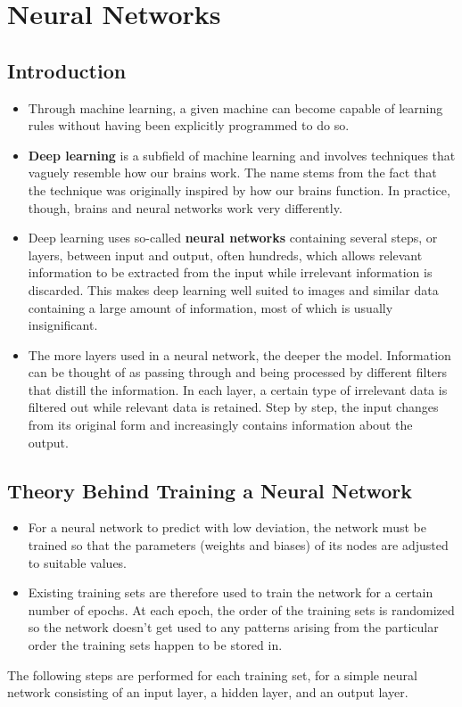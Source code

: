 
\section{Neural Networks}
\label{c3:sec:nn}\label{c3:app:a}

\subsection{Introduction}
\begin{itemize}
  \item Through machine learning, a given machine can become capable of learning rules without
    having been explicitly programmed to do so.
  \item \textbf{Deep learning} is a subfield of machine learning and involves techniques that
    vaguely resemble how our brains work. The name stems from the fact that the technique was
    originally inspired by how our brains function. In practice, though, brains and neural networks
    work very differently.
  \item Deep learning uses so-called \textbf{neural networks} containing several steps, or layers,
    between input and output, often hundreds, which allows relevant information to be extracted
    from the input while irrelevant information is discarded. This makes deep learning well suited
    to images and similar data containing a large amount of information, most of which is usually
    insignificant.
  \item The more layers used in a neural network, the deeper the model. Information can be thought
    of as passing through and being processed by different filters that distill the information.
    In each layer, a certain type of irrelevant data is filtered out while relevant data is
    retained. Step by step, the input changes from its original form and increasingly contains
    information about the output.
\end{itemize}

\subsection{Theory Behind Training a Neural Network}
\begin{itemize}
  \item For a neural network to predict with low deviation, the network must be trained so that the
    parameters (weights and biases) of its nodes are adjusted to suitable values.
  \item Existing training sets are therefore used to train the network for a certain number of
    epochs. At each epoch, the order of the training sets is randomized so the network doesn't get
    used to any patterns arising from the particular order the training sets happen to be stored
    in.
\end{itemize}
The following steps are performed for each training set, for a simple neural network consisting of
an input layer, a hidden layer, and an output layer.

